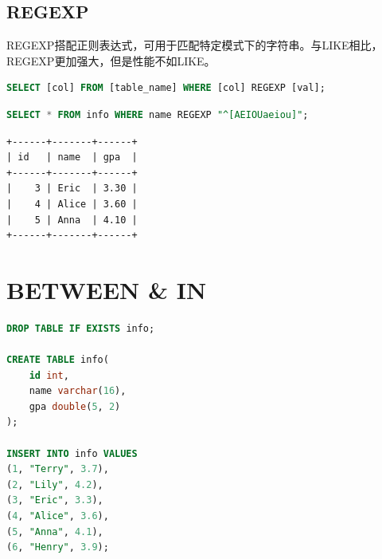 \documentclass[12pt, openany, oneside]{book}
\begin{document}
\vspace{0.5cm}

\section{REGEXP}

REGEXP搭配正则表达式，可用于匹配特定模式下的字符串。与LIKE相比，REGEXP更加强大，但是性能不如LIKE。

\vspace{-0.5cm}

\begin{lstlisting}[language=SQL]
SELECT [col] FROM [table_name] WHERE [col] REGEXP [val];
\end{lstlisting}

\vspace{0.5cm}


\begin{lstlisting}[language=SQL]
SELECT * FROM info WHERE name REGEXP "^[AEIOUaeiou]";
\end{lstlisting}

\begin{tcolorbox}
	\begin{verbatim}
+------+-------+------+
| id   | name  | gpa  |
+------+-------+------+
|    3 | Eric  | 3.30 |
|    4 | Alice | 3.60 |
|    5 | Anna  | 4.10 |
+------+-------+------+
\end{verbatim}
\end{tcolorbox}

\newpage

\chapter{BETWEEN \& IN}

\vspace{0.5cm}


\begin{lstlisting}[language=SQL]
DROP TABLE IF EXISTS info;

CREATE TABLE info(
    id int,
    name varchar(16),
    gpa double(5, 2)
);

INSERT INTO info VALUES
(1, "Terry", 3.7),
(2, "Lily", 4.2),
(3, "Eric", 3.3),
(4, "Alice", 3.6),
(5, "Anna", 4.1),
(6, "Henry", 3.9);
\end{lstlisting}

\vspace{0.5cm}
\end{document}
